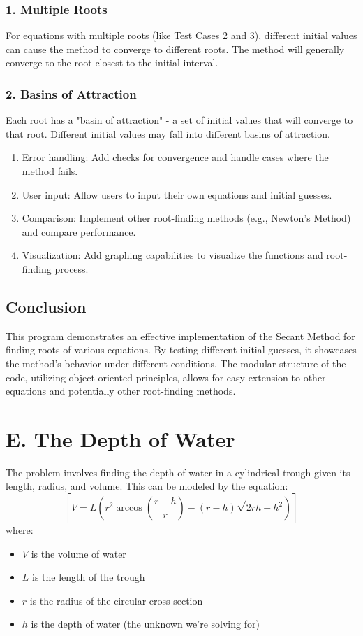 \documentclass{article}
\begin{document}
\subsubsection{1. Multiple Roots}
For equations with multiple roots (like Test Cases 2 and 3), different initial values can cause the method to converge to different roots. The method will generally converge to the root closest to the initial interval.
\subsubsection{2. Basins of Attraction}
Each root has a "basin of attraction" - a set of initial values that will converge to that root. Different initial values may fall into different basins of attraction.
\begin{enumerate}
\item Error handling: Add checks for convergence and handle cases where the method fails.
\item User input: Allow users to input their own equations and initial guesses.
\item Comparison: Implement other root-finding methods (e.g., Newton's Method) and compare performance.
\item Visualization: Add graphing capabilities to visualize the functions and root-finding process.
\end{enumerate}
\subsection{Conclusion}
This program demonstrates an effective implementation of the Secant Method for finding roots of various equations. By testing different initial guesses, it showcases the method's behavior under different conditions. The modular structure of the code, utilizing object-oriented principles, allows for easy extension to other equations and potentially other root-finding methods.



\section{E. The Depth of Water}
The problem involves finding the depth of water in a cylindrical trough given its length, radius, and volume. This can be modeled by the equation:
$$[ V = L(r^2 \arccos(\frac{r-h}{r}) - (r-h)\sqrt{2rh-h^2}) ]$$
where:
\begin{itemize}
\item $V$ is the volume of water
\item $L$ is the length of the trough
\item $r$ is the radius of the circular cross-section
\item $h$ is the depth of water (the unknown we're solving for)
\end{itemize}
\end{document}
